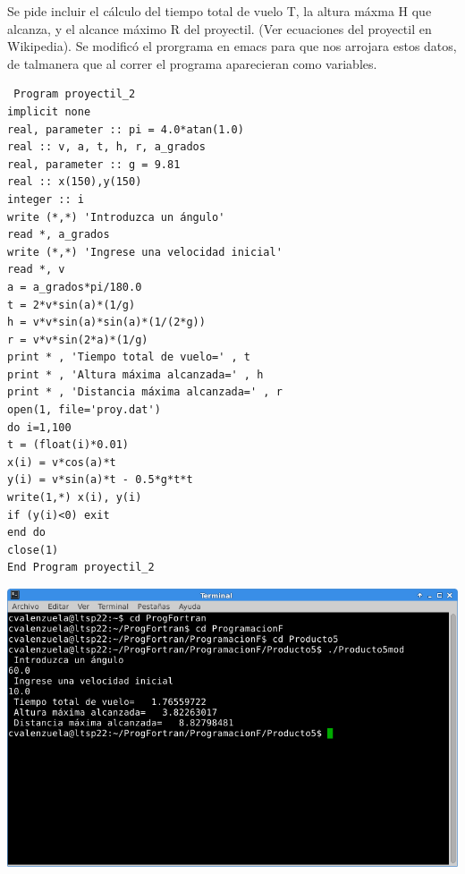\documentclass[12pt]{article}
\begin{document}
 \newpage
 Se pide incluir el cálculo del tiempo total de vuelo T, la altura máxma H que alcanza, y el alcance máximo R del proyectil. (Ver ecuaciones del proyectil en Wikipedia).
 Se modificó el prorgrama en emacs para que nos arrojara estos datos, de talmanera que al correr el programa aparecieran como variables.\\
 
 \begin{verbatim}
 Program proyectil_2
implicit none
real, parameter :: pi = 4.0*atan(1.0)
real :: v, a, t, h, r, a_grados
real, parameter :: g = 9.81
real :: x(150),y(150)
integer :: i
write (*,*) 'Introduzca un ángulo'
read *, a_grados
write (*,*) 'Ingrese una velocidad inicial'
read *, v
a = a_grados*pi/180.0
t = 2*v*sin(a)*(1/g)
h = v*v*sin(a)*sin(a)*(1/(2*g))
r = v*v*sin(2*a)*(1/g)
print * , 'Tiempo total de vuelo=' , t
print * , 'Altura máxima alcanzada=' , h
print * , 'Distancia máxima alcanzada=' , r
open(1, file='proy.dat')
do i=1,100
t = (float(i)*0.01)
x(i) = v*cos(a)*t
y(i) = v*sin(a)*t - 0.5*g*t*t
write(1,*) x(i), y(i)
if (y(i)<0) exit
end do
close(1)
End Program proyectil_2
 \end{verbatim}
 


 \centering
\includegraphics[scale=0.5]{Evidencias.png}
\end{document}
